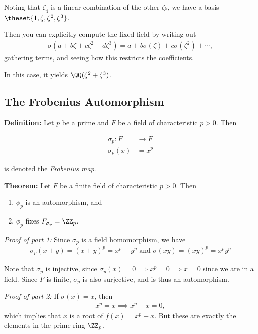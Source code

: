 Noting that \(\zeta_4\) is a linear combination of the other \(\zeta\)s,
we have a basis \(\theset{1, \zeta, \zeta^2, \zeta^3}\).

Then you can explicitly compute the fixed field by writing out
\begin{align*}
\sigma(a + b\zeta + c\zeta^2 + d\zeta^3) = a + b\sigma(\zeta) + c\sigma(\zeta^2) + \cdots
,\end{align*} gathering terms, and seeing how this restricts the
coefficients.

In this case, it yields \(\QQ(\zeta^2 + \zeta^3)\).

\hypertarget{the-frobenius-automorphism}{%
\subsection{The Frobenius
Automorphism}\label{the-frobenius-automorphism}}

\textbf{Definition:} Let \(p\) be a prime and \(F\) be a field of
characteristic \(p>0\). Then

\begin{align*}
\sigma_p: F &\to F \\
\sigma_p(x) &= x^p
\end{align*}

is denoted the \emph{Frobenius map}.

\textbf{Theorem:} Let \(F\) be a finite field of characteristic
\(p > 0\). Then

\begin{enumerate}
\def\labelenumi{\arabic{enumi}.}
\tightlist
\item
  \(\phi_p\) is an automorphism, and
\item
  \(\phi_p\) fixes \(F_{\sigma_p} = \ZZ_p\).
\end{enumerate}

\emph{Proof of part 1:} Since \(\sigma_p\) is a field homomorphism, we
have
\begin{align*}
\sigma_p(x+y) = (x+y)^p = x^p + y^p
\text{ and }
\sigma(xy) = (xy)^p = x^p y^p
\end{align*}

Note that \(\sigma_p\) is injective, since
\(\sigma_p(x) =0 \implies x^p=0 \implies x=0\) since we are in a field.
Since \(F\) is finite, \(\sigma_p\) is also surjective, and is thus an
automorphism.

\emph{Proof of part 2:} If \(\sigma(x) = x\), then
\begin{align*}
x^p = x \implies x^p-x = 0
,\end{align*} which implies that \(x\) is a root of \(f(x) = x^p - x\).
But these are exactly the elements in the prime ring \(\ZZ_p\).

